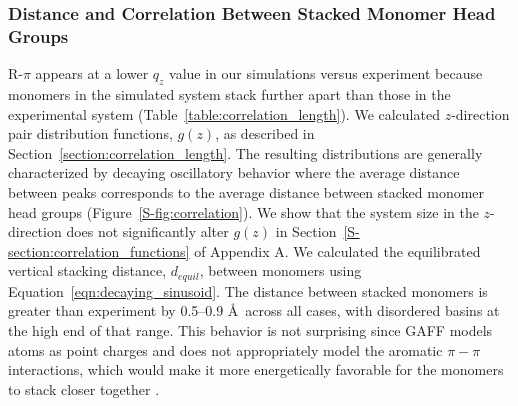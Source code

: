  \subsubsection{Distance and Correlation Between Stacked Monomer Head Groups}

  R-$\pi$ appears at a lower $q_z$ value in our simulations versus experiment
  because monomers in the simulated system stack further apart than those in the
  experimental system (Table~\ref{table:correlation_length}). We calculated
  $z$-direction pair distribution functions, $g(z)$, as described in
  Section~\ref{section:correlation_length}. The resulting distributions are
  generally characterized by decaying oscillatory behavior where the average
  distance between peaks corresponds to the average distance between stacked
  monomer head groups (Figure~\ref{S-fig:correlation}). We show that the system
  size in the $z$-direction does not significantly alter $g(z)$ in 
  Section~\ref{S-section:correlation_functions} of Appendix A. We calculated the
  equilibrated vertical stacking distance, $\mathit{d}_{equil}$, between monomers
  using Equation~\ref{eqn:decaying_sinusoid}. The distance between stacked
  monomers is greater than experiment by 0.5--0.9 \AA~across all cases, with
  disordered basins at the high end of that range. This behavior is not
  surprising since GAFF models atoms as point charges and does not appropriately
  model the aromatic $\pi-\pi$ interactions, which would make it more
  energetically favorable for the monomers to stack closer together
  \cite{wang_development_2004}. 

  
